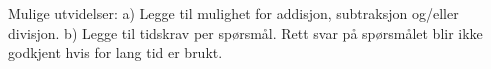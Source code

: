%
%
Mulige utvidelser:
a) Legge til mulighet for addisjon, subtraksjon og/eller divisjon.
b) Legge til tidskrav per spørsmål.
Rett svar på spørsmålet blir ikke godkjent hvis for lang tid er brukt.
